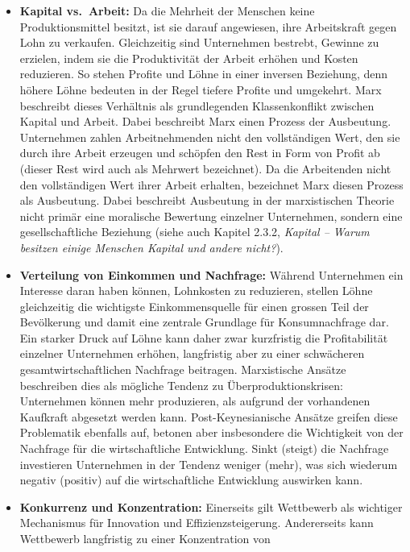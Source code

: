 \documentclass[
  nswissgerman,
  a4paper,
  DIV=11,
  numbers=noendperiod,
  oneside,
  openany]{scrreprt}
\begin{document}
\begin{itemize}
\item
  \textbf{Kapital vs.~Arbeit:} Da die Mehrheit der Menschen keine
  Produktionsmittel besitzt, ist sie darauf angewiesen, ihre
  Arbeitskraft gegen Lohn zu verkaufen. Gleichzeitig sind Unternehmen
  bestrebt, Gewinne zu erzielen, indem sie die Produktivität der Arbeit
  erhöhen und Kosten reduzieren. So stehen Profite und Löhne in einer
  inversen Beziehung, denn höhere Löhne bedeuten in der Regel tiefere
  Profite und umgekehrt. Marx beschreibt dieses Verhältnis als
  grundlegenden Klassenkonflikt zwischen Kapital und Arbeit. Dabei
  beschreibt Marx einen Prozess der Ausbeutung. Unternehmen zahlen
  Arbeitnehmenden nicht den vollständigen Wert, den sie durch ihre
  Arbeit erzeugen und schöpfen den Rest in Form von Profit ab (dieser
  Rest wird auch als Mehrwert bezeichnet). Da die Arbeitenden nicht den
  vollständigen Wert ihrer Arbeit erhalten, bezeichnet Marx diesen
  Prozess als Ausbeutung. Dabei beschreibt Ausbeutung in der
  marxistischen Theorie nicht primär eine moralische Bewertung einzelner
  Unternehmen, sondern eine gesellschaftliche Beziehung (siehe auch
  Kapitel 2.3.2, \emph{Kapital -- Warum besitzen einige Menschen Kapital
  und andere nicht?}).
\item
  \textbf{Verteilung von Einkommen und Nachfrage:} Während Unternehmen
  ein Interesse daran haben können, Lohnkosten zu reduzieren, stellen
  Löhne gleichzeitig die wichtigste Einkommensquelle für einen grossen
  Teil der Bevölkerung und damit eine zentrale Grundlage für
  Konsumnachfrage dar. Ein starker Druck auf Löhne kann daher zwar
  kurzfristig die Profitabilität einzelner Unternehmen erhöhen,
  langfristig aber zu einer schwächeren gesamtwirtschaftlichen Nachfrage
  beitragen. Marxistische Ansätze beschreiben dies als mögliche Tendenz
  zu Überproduktionskrisen: Unternehmen können mehr produzieren, als
  aufgrund der vorhandenen Kaufkraft abgesetzt werden kann.
  Post-Keynesianische Ansätze greifen diese Problematik ebenfalls auf,
  betonen aber insbesondere die Wichtigkeit von der Nachfrage für die
  wirtschaftliche Entwicklung. Sinkt (steigt) die Nachfrage investieren
  Unternehmen in der Tendenz weniger (mehr), was sich wiederum negativ
  (positiv) auf die wirtschaftliche Entwicklung auswirken kann.
\item
  \textbf{Konkurrenz und Konzentration:} Einerseits gilt Wettbewerb als
  wichtiger Mechanismus für Innovation und Effizienzsteigerung.
  Andererseits kann Wettbewerb langfristig zu einer Konzentration von

\end{itemize}
\end{document}
